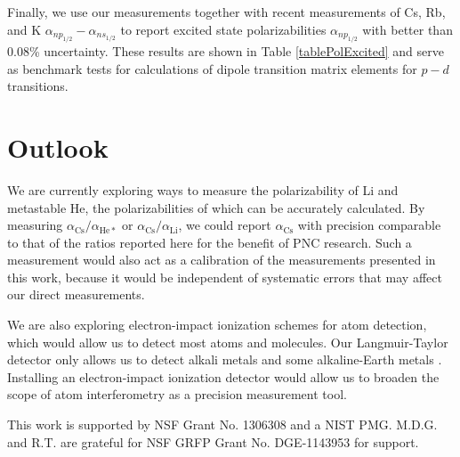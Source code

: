 \documentclass[twocolumn,pra,showpacs,superscriptaddress,longbibliography]{revtex4-1}   %
\newcommand{\acs}{\alpha_{\textrm{Cs}}}
\begin{document}
Finally, we use our measurements together with recent measurements of Cs, Rb, and K $\alpha_{np_{1/2}} - \alpha_{ns_{1/2}}$ \cite{Hunter1991,Miller1994} to report excited state polarizabilities $\alpha_{np_{1/2}}$ with better than 0.08\% uncertainty. 
These results are shown in Table \ref{tablePolExcited} and serve as benchmark tests for calculations of dipole transition matrix elements for $p-d$ transitions.

\section{Outlook} \label{sectionOutlook}

We are currently exploring ways to measure the polarizability of Li and metastable He, the polarizabilities of which can be accurately calculated. By measuring $\acs/\alpha_{\mathrm{He*}}$ or $\acs/\alpha_{\mathrm{Li}}$, we could report $\acs$ with precision comparable to that of the ratios reported here for the benefit of PNC research. Such a measurement would also act as a calibration of the measurements presented in this work, because it would be independent of systematic errors that may affect our direct measurements.

We are also exploring electron-impact ionization schemes for atom detection, which would allow us to detect most atoms and molecules. Our Langmuir-Taylor detector only allows us to detect alkali metals and some alkaline-Earth metals \cite{Delhuille2002}. Installing an electron-impact ionization detector would allow us to broaden the scope of atom interferometry as a precision measurement tool. 

This work is supported by NSF Grant No. 1306308 and a NIST PMG. M.D.G. and R.T. are grateful for NSF GRFP Grant No. DGE-1143953 for support. 

%
%

\end{document}
